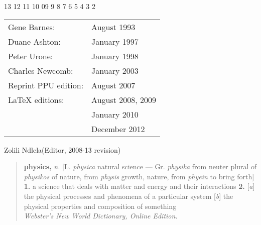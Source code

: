 \begin{center}
13 12 11 10 09  \hspace{2em}9 8 7 6 5 4 3 2       
\end{center}
\begin{center}
\begin{tabular}{ll}
Gene Barnes:						& August 1993 \\
Duane Ashton:					& January 1997 \\
Peter Urone:						& January 1998 \\
Charles Newcomb:            & January 2003 \\
Reprint PPU edition:			& August 2007 \\
LaTeX editions:					& August 2008, 2009\\
									& January 2010 \\
									& December 2012

\end{tabular}
\end{center}
\vfill
\hspace*{\fill}Zolili Ndlela\quad(Editor, 2008-13 revision)
\endgroup

\clearpage

\begin{quote}
\textbf{physics,} \textit{n.} [L. \textit{physica} natural science --- Gr. \textit{physika} from neuter plural of \textit{physikos} of nature, from \textit{physis} growth, nature, from \textit{phyein} to bring forth]
  \hspace{1ex} \textbf{1.} a science that deals with matter and energy and their interactions 
  \hspace{1ex} \textbf{2.} [\textit{a}] the physical processes and phenomena of a particular system [\textit{b}] the physical properties and composition of something
      \\[0.5\baselineskip]
  \hspace*{\fill} \textit{Webster's New World Dictionary, Online Edition}.
\end{quote}

